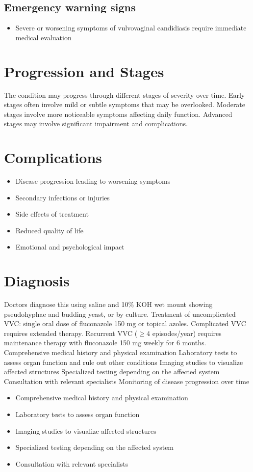 \subsection{Emergency warning signs}
\begin{itemize}[noitemsep]
  \item Severe or worsening symptoms of vulvovaginal candidiasis require immediate medical evaluation
\end{itemize}
\section{Progression and Stages}
The condition may progress through different stages of severity over time. Early stages often involve mild or subtle symptoms that may be overlooked. Moderate stages involve more noticeable symptoms affecting daily function. Advanced stages may involve significant impairment and complications.
\section{Complications}
\begin{itemize}[noitemsep]
  \item Disease progression leading to worsening symptoms
  \item Secondary infections or injuries
  \item Side effects of treatment
  \item Reduced quality of life
  \item Emotional and psychological impact
\end{itemize}
\section{Diagnosis}
Doctors diagnose this using saline and 10\% KOH wet mount showing pseudohyphae and budding yeast, or by culture. Treatment of uncomplicated VVC: single oral dose of fluconazole 150 mg or topical azoles. Complicated VVC requires extended therapy. Recurrent VVC ($\ge$4 episodes/year) requires maintenance therapy with fluconazole 150 mg weekly for 6 months. Comprehensive medical history and physical examination Laboratory tests to assess organ function and rule out other conditions Imaging studies to visualize affected structures Specialized testing depending on the affected system Consultation with relevant specialists Monitoring of disease progression over time

\begin{itemize}[noitemsep]
  \item Comprehensive medical history and physical examination
  \item Laboratory tests to assess organ function
  \item Imaging studies to visualize affected structures
  \item Specialized testing depending on the affected system
  \item Consultation with relevant specialists
\end{itemize}
